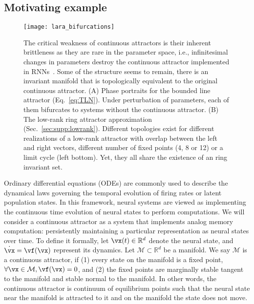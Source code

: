 \documentclass{article} %
\newcounter{ct}
\newcommand{\reals}{\mathbb{R}}
\newcommand{\manifold}{\mathcal{M}}
\theoremstyle{definition}
\theoremstyle{remark}
\renewcommand{\cite}{\citep}
\begin{document}
\subsection{Motivating example}\label{sec:motivating}
\begin{figure}[tbhp]
  \centering
  \texttt{[image: lara\_bifurcations]}
  \caption{The critical weakness of continuous attractors is their inherent brittleness as they are rare in the parameter space, i.e., infinitesimal changes in parameters destroy the continuous attractor implemented in RNNs~\cite{seung1996,Renart2003}.
  Some of the structure seems to remain, there is an invariant manifold that is topologically equivalent to the original continuous attractor.
    (A) Phase portraits for the bounded line attractor (Eq.~\eqref{eq:TLN}).
    Under perturbation of parameters, each of them bifurcates to systems without the continuous attractor.
    (B) The low-rank ring attractor approximation (Sec.~\eqref{sec:supp:lowrank}). 
    Different topologies exist for different realizations of a low-rank attractor with overlap between the left and right vectors, different number of fixed points (4, 8 or 12) or a limit cycle (left bottom).
    Yet, they all share the existence of an ring invariant set.
}
\label{fig:lara_bifurcations}
\end{figure}


Ordinary differential equations (ODEs) are commonly used to describe the dynamical laws governing the temporal evolution of firing rates or latent population states\cite{vyas2020}.
In this framework, neural systems are viewed as implementing the continuous time evolution of neural states to perform computations.
We will consider a continuous attractor as a system that implements analog memory computation: persistently maintaining a particular representation as neural states over time.
To define it formally, let $\vx(t) \in \reals^d$ denote the neural state, and $\dot{\vx} = \vf(\vx)$ represent its dynamics.
Let $\manifold \subset \reals^d$ be a manifold.
We say $\manifold$ is a continuous attractor, if (1) every state on the manifold is a fixed point, $\forall \vx \in \manifold, \vf(\vx) = 0$, and (2) the fixed points are marginally stable tangent to the manifold and stable normal to the manifold.
In other words, the continuous attractor is continuum of equilibrium points such that the neural state near the manifold is attracted to it and on the manifold the state does not move.
\end{document}
